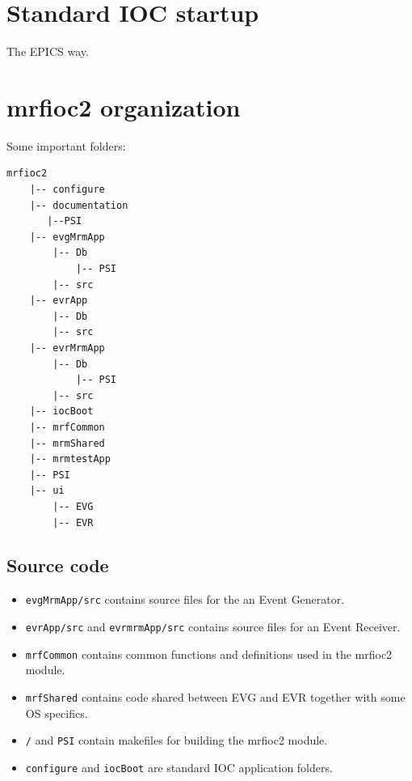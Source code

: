 \documentclass[12pt,a4paper]{article}
\let\stdsection\section
\renewcommand\section{\newpage\stdsection}
\begin{document}
\section{Standard IOC startup}
The EPICS way.

\section{mrfioc2 organization}\label{sec:Source code organization}
Some important folders:
\begin{verbatim}
mrfioc2
    |-- configure
    |-- documentation
       |--PSI
    |-- evgMrmApp
        |-- Db
            |-- PSI
        |-- src
    |-- evrApp
        |-- Db
        |-- src
    |-- evrMrmApp
        |-- Db
            |-- PSI
        |-- src
    |-- iocBoot
    |-- mrfCommon
    |-- mrmShared
    |-- mrmtestApp
    |-- PSI
    |-- ui
        |-- EVG
        |-- EVR
\end{verbatim}

\subsection{Source code}
\begin{itemize}
\item 
	\texttt{evgMrmApp/src} contains source files for the an Event Generator.
\item 
	\texttt{evrApp/src} and \texttt{evrmrmApp/src} contains source files for an Event Receiver.
\item 
	\texttt{mrfCommon} contains common functions and definitions used in the mrfioc2 module. 
\item 
	\texttt{mrfShared} contains code shared between EVG and EVR together with some OS specifics.
\item 
	\texttt{/} and \texttt{PSI} contain makefiles for building the mrfioc2 module.
\item 
	\texttt{configure} and \texttt{iocBoot} are standard IOC application folders.
\end{itemize}
\end{document}

